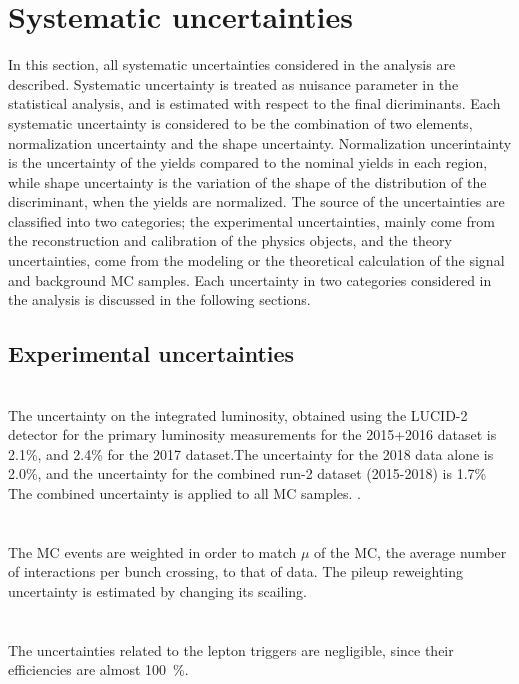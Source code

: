 \chapter{Systematic uncertainties}
\label{chap:systematics}
In this section, all systematic uncertainties considered in the analysis are described. 
Systematic uncertainty is treated as nuisance parameter in the statistical analysis, and is estimated with respect to the final dicriminants.
Each systematic uncertainty is considered to be the combination of two elements, normalization uncertainty and the shape uncertainty. 
Normalization uncerintainty is the uncertainty of the yields compared to the nominal yields in each region, while shape uncertainty is the variation of the shape of the distribution of the discriminant, when the yields are normalized.
The source of the uncertainties are classified into two categories; the experimental uncertainties, mainly come from the reconstruction and calibration of the physics objects, and the theory uncertainties, come from the modeling or the theoretical calculation of the signal and background MC samples.
Each uncertainty in two categories considered in the analysis is discussed in the following sections.

\section{Experimental uncertainties}
\noindent\textbf{}\\
The uncertainty on the integrated luminosity, obtained using the LUCID-2 detector for the primary luminosity measurements for the 2015+2016 dataset is 2.1\%, and 2.4\% for the 2017 dataset.The uncertainty for the 2018 data alone is 2.0\%, and the uncertainty for the combined run-2 dataset (2015-2018) is 1.7\% The combined uncertainty is applied to all MC samples. \cite{AtlasLumiRun2}. \\ 
\\
\noindent\textbf{}\\
The MC events are weighted in order to match $\mu$ of the MC, the average number of interactions per bunch crossing, to that of data. 
The pileup reweighting uncertainty is estimated by changing its scailing. \\
\\
\noindent\textbf{}\\
The uncertainties related to the lepton triggers are negligible, since their efficiencies are almost 100~\%.

